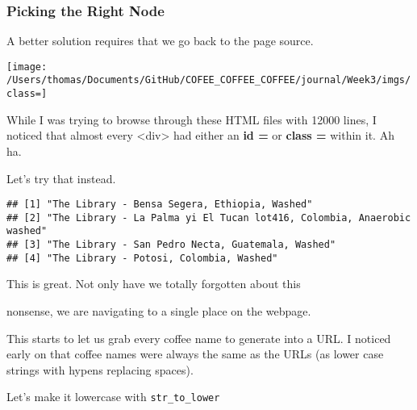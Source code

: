 \documentclass[]{article}
\newenvironment{Shaded}{\begin{snugshade}}{\end{snugshade}}
\newcommand{\DataTypeTok}[1]{\textcolor[rgb]{0.13,0.29,0.53}{#1}}
\newcommand{\KeywordTok}[1]{\textcolor[rgb]{0.13,0.29,0.53}{\textbf{#1}}}
\newcommand{\NormalTok}[1]{#1}
\newcommand{\OperatorTok}[1]{\textcolor[rgb]{0.81,0.36,0.00}{\textbf{#1}}}
\newcommand{\StringTok}[1]{\textcolor[rgb]{0.31,0.60,0.02}{#1}}
\begin{document}
\hypertarget{picking-the-right-node}{%
\subsubsection{Picking the Right Node}\label{picking-the-right-node}}

A better solution requires that we go back to the page source.

\texttt{[image: /Users/thomas/Documents/GitHub/COFEE\_COFFEE\_COFFEE/journal/Week3/imgs/class=]}

While I was trying to browse through these HTML files with 12000 lines,
I noticed that almost every \textless{}div\textgreater{} had either an
\textbf{id =} or \textbf{class =} within it. Ah ha.

Let's try that instead.

\begin{Shaded}
\end{Shaded}

\begin{verbatim}
## [1] "The Library - Bensa Segera, Ethiopia, Washed"                         
## [2] "The Library - La Palma yi El Tucan lot416, Colombia, Anaerobic washed"
## [3] "The Library - San Pedro Necta, Guatemala, Washed"                     
## [4] "The Library - Potosi, Colombia, Washed"
\end{verbatim}

This is great. Not only have we totally forgotten about this

nonsense, we are navigating to a single place on the webpage.

This starts to let us grab every coffee name to generate into a URL. I
noticed early on that coffee names were always the same as the URLs (as
lower case strings with hypens replacing spaces).

Let's make it lowercase with \texttt{str\_to\_lower}

\begin{Shaded}
\end{Shaded}
\end{document}
